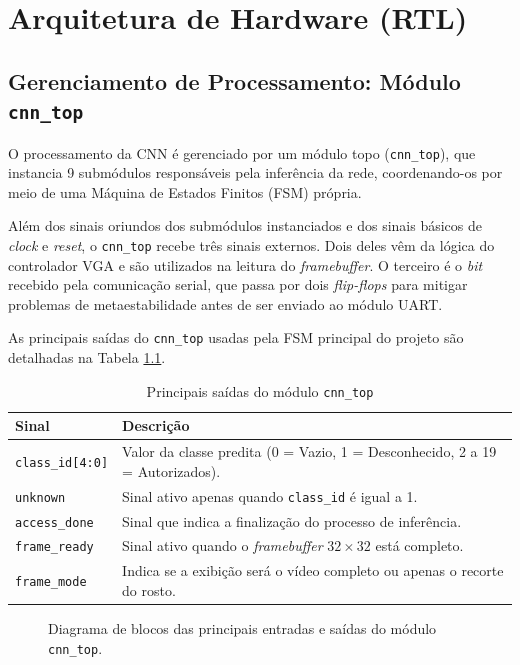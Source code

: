 \chapter{Arquitetura de Hardware (RTL)}
\section{Gerenciamento de Processamento: Módulo \texttt{cnn\_top}}

O processamento da CNN é gerenciado por um módulo topo (\texttt{cnn\_top}), que instancia 9 submódulos responsáveis pela inferência da rede, coordenando-os por meio de uma Máquina de Estados Finitos (FSM) própria.

Além dos sinais oriundos dos submódulos instanciados e dos sinais básicos de \textit{clock} e \textit{reset}, o \texttt{cnn\_top} recebe três sinais externos. Dois deles vêm da lógica do controlador VGA e são utilizados na leitura do \textit{framebuffer}. O terceiro é o \textit{bit} recebido pela comunicação serial, que passa por dois \textit{flip-flops} para mitigar problemas de metaestabilidade antes de ser enviado ao módulo UART.

As principais saídas do \texttt{cnn\_top} usadas pela FSM principal do projeto são detalhadas na Tabela \ref{tab:sinais_cnn_top}.

\begin{table}[htbp]
\centering
\caption{Principais saídas do módulo \texttt{cnn\_top}}
\label{tab:sinais_cnn_top}
\small
\begin{tabularx}{\textwidth}{l X}
\toprule
\textbf{Sinal} & \textbf{Descrição} \\
\midrule
\texttt{class\_id[4:0]} & Valor da classe predita (0 = Vazio, 1 = Desconhecido, 2 a 19 = Autorizados). \\
\texttt{unknown} & Sinal ativo apenas quando \texttt{class\_id} é igual a 1. \\
\texttt{access\_done} & Sinal que indica a finalização do processo de inferência. \\
\texttt{frame\_ready} & Sinal ativo quando o \textit{framebuffer} $32 \times 32$ está completo. \\
\texttt{frame\_mode} & Indica se a exibição será o vídeo completo ou apenas o recorte do rosto. \\
\bottomrule
\end{tabularx}
\end{table}

\begin{figure}[htbp]
    \centering
    \caption{Diagrama de blocos das principais entradas e saídas do módulo \texttt{cnn\_top}.}
    \label{fig:diagrama_cnn_top}
\end{figure}

